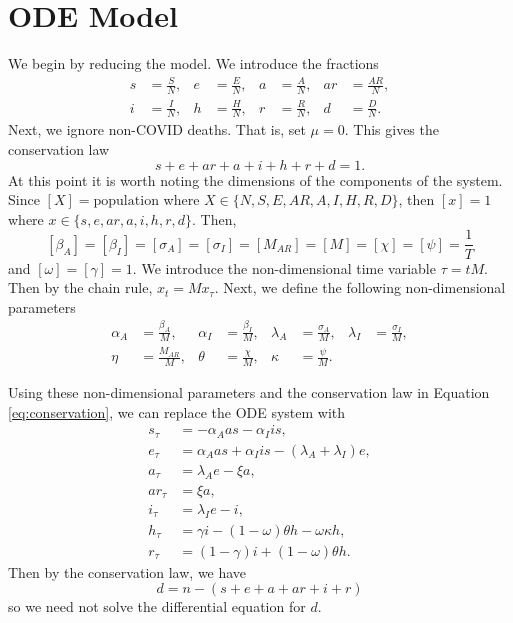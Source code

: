 \documentclass[11pt]{article}
\begin{document}
\section{ODE Model}
	We begin by reducing the model.
	We introduce the fractions
	\begin{align*}
		s &= \frac{S}{N}, & e &= \frac{E}{N}, & a &= \frac{A}{N}, & ar &= \frac{AR}{N}, \\
		i &= \frac{I}{N}, & h &= \frac{H}{N}, & r &= \frac{R}{N}, & d &= \frac{D}{N}.
	\end{align*}
	Next, we ignore non-COVID deaths.
	That is, set $\mu = 0$.
	This gives the conservation law
	\begin{equation} \label{eq:conservation}
		s + e + ar + a + i + h + r + d = 1.
	\end{equation}
	At this point it is worth noting the dimensions of the components of the system.
	Since $[X] = \mathrm{population}$ where $X \in \{N, S, E, AR, A, I, H, R, D\}$, then $[x] = 1$ where $x \in \{s, e, ar, a, i, h, r, d\}$.
	Then,
	$$[\beta_A] = [\beta_I] = [\sigma_A] = [\sigma_I] = [M_{AR}] = [M] = [\chi] = [\psi] = \frac{1}{T}$$
	and $[\omega] = [\gamma] = 1$.
	We introduce the non-dimensional time variable $\tau = t M$.
	Then by the chain rule, $x_t = M x_\tau$.
	Next, we define the following non-dimensional parameters
	\begin{align*}
		\alpha_A &= \frac{\beta_A}{M}, & \alpha_I &= \frac{\beta_I}{M}, & \lambda_A &= \frac{\sigma_A}{M}, & \lambda_I &= \frac{\sigma_I}{M}, \\
		\eta &= \frac{M_{AR}}{M}, & \theta &= \frac{\chi}{M}, & \kappa &= \frac{\psi}{M}.
	\end{align*}
	
	Using these non-dimensional parameters and the conservation law in Equation \ref{eq:conservation}, we can replace the ODE system with
	\begin{align}
		\label{eq:s_t}
		s_\tau &= - \alpha_A a s - \alpha_I i s, \\
		\label{eq:e_t}
		e_\tau &= \alpha_A a s + \alpha_I i s - (\lambda_A + \lambda_I) e, \\
		\label{eq:a_t}
		a_\tau &= \lambda_A e - \xi a, \\
		\label{eq:ar_t}
		ar_\tau &= \xi a, \\
		\label{eq:i_t}
		i_\tau &= \lambda_I e - i, \\
		\label{eq:h_t}
		h_\tau &= \gamma i - (1 - \omega) \theta h - \omega \kappa h, \\
		\label{eq:r_t}
		r_\tau &= (1 - \gamma) i + (1 - \omega) \theta h.
	\end{align}
	Then by the conservation law, we have
	\begin{equation} \label{eq:d_t}
		d = n - (s + e + a + ar + i + r)
	\end{equation}
	so we need not solve the differential equation for $d$.
	
\end{document}
